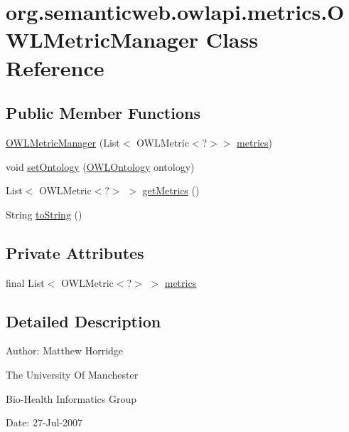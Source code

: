 \hypertarget{classorg_1_1semanticweb_1_1owlapi_1_1metrics_1_1_o_w_l_metric_manager}{\section{org.\-semanticweb.\-owlapi.\-metrics.\-O\-W\-L\-Metric\-Manager Class Reference}
\label{classorg_1_1semanticweb_1_1owlapi_1_1metrics_1_1_o_w_l_metric_manager}
}
\subsection*{Public Member Functions}
\begin{DoxyCompactItemize}
\item 
\hyperlink{classorg_1_1semanticweb_1_1owlapi_1_1metrics_1_1_o_w_l_metric_manager_a1debf983527a87c48b9cee26b30c320f}{O\-W\-L\-Metric\-Manager} (List$<$ O\-W\-L\-Metric$<$?$>$$>$ \hyperlink{classorg_1_1semanticweb_1_1owlapi_1_1metrics_1_1_o_w_l_metric_manager_aceffcccd9bb76f7e50185ece1ace9225}{metrics})
\item 
void \hyperlink{classorg_1_1semanticweb_1_1owlapi_1_1metrics_1_1_o_w_l_metric_manager_a8ede09826af03a5a23600b4a6bf92727}{set\-Ontology} (\hyperlink{interfaceorg_1_1semanticweb_1_1owlapi_1_1model_1_1_o_w_l_ontology}{O\-W\-L\-Ontology} ontology)
\item 
List$<$ O\-W\-L\-Metric$<$?$>$ $>$ \hyperlink{classorg_1_1semanticweb_1_1owlapi_1_1metrics_1_1_o_w_l_metric_manager_a125f3b927da8f7e39366ab17fd614ff5}{get\-Metrics} ()
\item 
String \hyperlink{classorg_1_1semanticweb_1_1owlapi_1_1metrics_1_1_o_w_l_metric_manager_a63252e00c4b0d588a3e31bd1fc299a97}{to\-String} ()
\end{DoxyCompactItemize}
\subsection*{Private Attributes}
\begin{DoxyCompactItemize}
\item 
final List$<$ O\-W\-L\-Metric$<$?$>$ $>$ \hyperlink{classorg_1_1semanticweb_1_1owlapi_1_1metrics_1_1_o_w_l_metric_manager_aceffcccd9bb76f7e50185ece1ace9225}{metrics}
\end{DoxyCompactItemize}


\subsection{Detailed Description}
Author\-: Matthew Horridge\par
 The University Of Manchester\par
 Bio-\/\-Health Informatics Group\par
 Date\-: 27-\/\-Jul-\/2007\par
 \par
 

